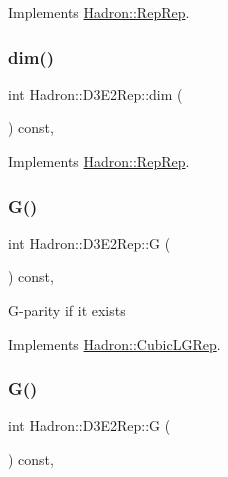 Implements \mbox{\hyperlink{structHadron_1_1RepRep_a92c8802e5ed7afd7da43ccfd5b7cd92b}{Hadron\+::\+Rep\+Rep}}.

\mbox{\label{structHadron_1_1D3E2Rep_a79f191ce59b4b506979041561fd3efd1}} 
\subsubsection{\texorpdfstring{dim()}{dim()}\hspace{0.1cm}{\footnotesize\ttfamily [3/3]}}
{\footnotesize\ttfamily int Hadron\+::\+D3\+E2\+Rep\+::dim (\begin{DoxyParamCaption}{ }\end{DoxyParamCaption}) const\hspace{0.3cm}{\ttfamily [inline]}, {\ttfamily [virtual]}}



Implements \mbox{\hyperlink{structHadron_1_1RepRep_a92c8802e5ed7afd7da43ccfd5b7cd92b}{Hadron\+::\+Rep\+Rep}}.

\mbox{\label{structHadron_1_1D3E2Rep_a8bfbc6b5f5972d0b979d0a730583c795}} 
\subsubsection{\texorpdfstring{G()}{G()}\hspace{0.1cm}{\footnotesize\ttfamily [1/2]}}
{\footnotesize\ttfamily int Hadron\+::\+D3\+E2\+Rep\+::G (\begin{DoxyParamCaption}{ }\end{DoxyParamCaption}) const\hspace{0.3cm}{\ttfamily [inline]}, {\ttfamily [virtual]}}

G-\/parity if it exists 

Implements \mbox{\hyperlink{structHadron_1_1CubicLGRep_ace26f7b2d55e3a668a14cb9026da5231}{Hadron\+::\+Cubic\+L\+G\+Rep}}.

\mbox{\label{structHadron_1_1D3E2Rep_a8bfbc6b5f5972d0b979d0a730583c795}} 
\subsubsection{\texorpdfstring{G()}{G()}\hspace{0.1cm}{\footnotesize\ttfamily [2/2]}}
{\footnotesize\ttfamily int Hadron\+::\+D3\+E2\+Rep\+::G (\begin{DoxyParamCaption}{ }\end{DoxyParamCaption}) const\hspace{0.3cm}{\ttfamily [inline]}, {\ttfamily [virtual]}}

